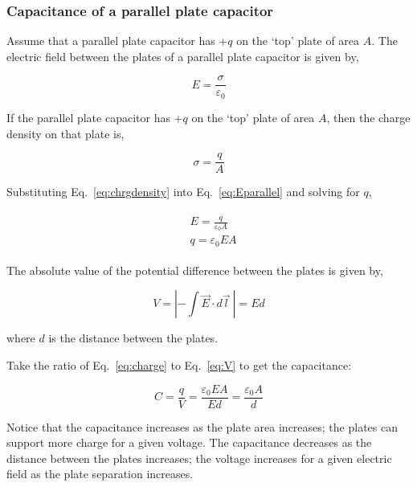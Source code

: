 \documentclass[12pt]{article}
\begin{document}
\begin{flushleft}
\subsubsection*{\bf Capacitance of a parallel plate capacitor}

Assume that a parallel plate capacitor has $+q$ on the `top' plate of area $A$.  The electric field between the plates of a parallel plate capacitor is given by,

\begin{equation}
E=\frac{\sigma}{\varepsilon_{0}}
\label{eq:Eparallel}
\end{equation}

If the parallel plate capacitor has $+q$ on the `top' plate of area $A$, then the charge density on that plate is,

 \begin{equation}
 \sigma = \frac{q}{A}
 \label{eq:chrgdensity}
 \end{equation}

Substituting Eq.~\ref{eq:chrgdensity} into Eq.~\ref{eq:Eparallel} and solving for $q$,

\begin{eqnarray}
\begin{aligned}
 & E  =  \frac{q}{\varepsilon_{0}A} \\
 & q =  \varepsilon_{0}EA 
 \label{eq:charge}
\end{aligned}
\end{eqnarray}

The absolute value of the potential difference between the plates is given by,

\begin{equation}
V=\left| -\int{\vec{E} \cdot d\vec{l}} \: \right| = Ed
\label{eq:V}
\end{equation}

where $d$ is the distance between the plates.

Take the ratio of Eq.~\ref{eq:charge} to Eq.~\ref{eq:V} to get the capacitance:

\begin{equation*}
C=\frac{q}{V}=\frac{\varepsilon_{0}EA }{Ed}=\frac{\varepsilon_{0}A }{d}
\end{equation*}

Notice that the capacitance increases as the plate area increases; the plates can support more charge for a given voltage.  The capacitance decreases as the distance between the plates increases; the voltage increases for a given electric field as the plate separation increases.


\end{flushleft}
\end{document}

